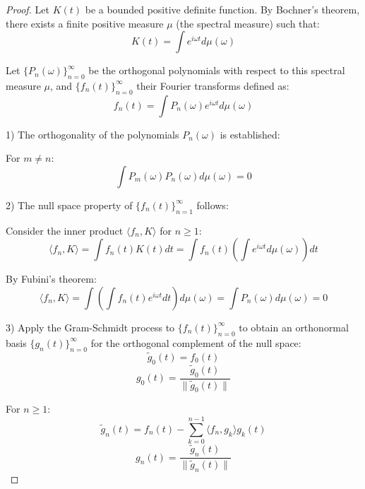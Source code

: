 \documentclass{article}
\begin{document}
\begin{proof}
  Let $K(t)$ be a bounded positive definite function. By Bochner's theorem, 
  there exists a finite positive measure $\mu$ (the spectral measure) such that:
  \begin{equation}
    K(t) = \int e^{i\omega t} d\mu(\omega)
  \end{equation}
  
  Let $\{P_n(\omega)\}_{n=0}^{\infty}$ be the orthogonal polynomials with respect 
  to this spectral measure $\mu$, and $\{f_n(t)\}_{n=0}^{\infty}$ their Fourier 
  transforms defined as:
  \begin{equation}
    f_n(t) = \int P_n(\omega) e^{i\omega t} d\mu(\omega)
  \end{equation}

  1) The orthogonality of the polynomials $P_n(\omega)$ is established:
  
  For $m \neq n$:
  \begin{equation}
    \int P_m(\omega) P_n(\omega) d\mu(\omega) = 0
  \end{equation}

  2) The null space property of $\{f_n(t)\}_{n=1}^{\infty}$ follows:

  Consider the inner product $\langle f_n, K \rangle$ for $n \geq 1$:
  \begin{equation}
    \langle f_n, K \rangle = \int f_n(t) K(t) dt = \int f_n(t) \left(\int 
    e^{i\omega t} d\mu(\omega)\right) dt
  \end{equation}

  By Fubini's theorem:
  \begin{equation}
    \langle f_n, K \rangle = \int \left(\int f_n(t) e^{i\omega t} dt\right) 
    d\mu(\omega) = \int P_n(\omega) d\mu(\omega) = 0
  \end{equation}

  3) Apply the Gram-Schmidt process to $\{f_n(t)\}_{n=0}^{\infty}$ to obtain 
  an orthonormal basis $\{g_n(t)\}_{n=0}^{\infty}$ for the orthogonal complement 
  of the null space:
  \begin{equation}
    \tilde{g}_0(t) = f_0(t)
  \end{equation}
  \begin{equation}
    g_0(t) = \frac{\tilde{g}_0(t)}{\|\tilde{g}_0(t)\|}
  \end{equation}

  For $n \geq 1$:
  \begin{equation}
    \tilde{g}_n(t) = f_n(t) - \sum_{k=0}^{n-1} \langle f_n, g_k \rangle g_k(t)
  \end{equation}
  \begin{equation}
    g_n(t) = \frac{\tilde{g}_n(t)}{\|\tilde{g}_n(t)\|}
  \end{equation}


\end{proof}
\end{document}
